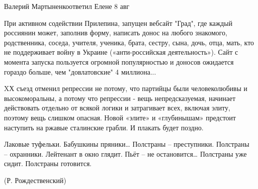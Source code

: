 Валерий Мартыненкоответил Елене
8 авг

При активном содействии Прилепина, запущен вебсайт "Град", где каждый россиянин
может, заполнив форму, написать донос на любого знакомого, родственника,
соседа, учителя, ученика, брата, сестру, сына, дочь, отца, мать, кто не
поддерживает войну в Украине («анти-российская деятельность»). Сайт с момента
запуска пользуется огромной популярностью и доносов ожидается гораздо больше,
чем "довлатовские" 4 миллиона...

XХ съезд отменил репрессии не потому, что партийцы были человеколюбивы и
высокоморальны, а потому что репрессии - вещь непредсказуемая, начинает
действовать отдельно от всякой логики и затрагивает всех, включая элиту,
поэтому вещь слишком опасная. Новой «элите» и «глубинышам» предстоит наступить
на ржавые сталинские грабли. И плакать будет поздно. 

Лаковые туфельки. 
Бабушкины пряники… 
Полстраны – преступники. 
Полстраны – охранники. 
Лейтенант в окно глядит. 
Пьёт – не остановится… 
Полстраны уже сидит. 
Полстраны готовится. 

(Р. Рождественский)






